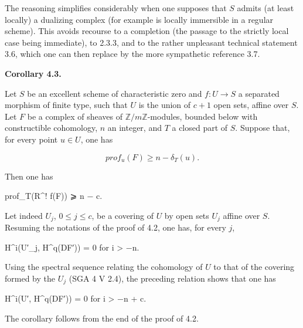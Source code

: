 \documentclass[
  11pt,
  a4paper,
]{book}
\newenvironment{Shaded}{}{}
\newcommand{\NormalTok}[1]{#1}
\begin{document}
The reasoning simplifies considerably when one supposes that \(S\)
admits (at least locally) a dualizing complex (for example is locally
immersible in a regular scheme). This avoids recourse to a completion
(the passage to the strictly local case being immediate), to 2.3.3, and
to the rather unpleasant technical statement 3.6, which one can then
replace by the more sympathetic reference 3.7.

\textbf{Corollary 4.3.}

Let \(S\) be an excellent scheme of characteristic zero and
\(f : U \to S\) a separated morphism of finite type, such that \(U\) is
the union of \(c + 1\) open sets, affine over \(S\). Let \(F\) be a
complex of sheaves of \(\mathbb{Z}/m\mathbb{Z}\)-modules, bounded below
with constructible cohomology, \(n\) an integer, and \(T\) a closed part
of \(S\). Suppose that, for every point \(u \in U\), one has

\[ prof_{u}(F) \geqslant n - \delta_{T}(u). \]

Then one has

\begin{Shaded}
\begin{Highlighting}[]
\NormalTok{prof\_T(R\^{}! f(F)) ⩾ n − c.}
\end{Highlighting}
\end{Shaded}

Let indeed \(U_{j}\), \(0 \leqslant j \leqslant c\), be a covering of
\(U\) by open sets \(U_{j}\) affine over \(S\). Resuming the notations
of the proof of 4.2, one has, for every \(j\),

\begin{Shaded}
\begin{Highlighting}[]
\NormalTok{H\^{}i(U′\_j, H\^{}q(DF′)) = 0 for i \textgreater{} −n.}
\end{Highlighting}
\end{Shaded}

Using the spectral sequence relating the cohomology of \(U\) to that of
the covering formed by the \(U_{j}\) (SGA 4 V 2.4), the preceding
relation shows that one has

\begin{Shaded}
\begin{Highlighting}[]
\NormalTok{H\^{}i(U′, H\^{}q(DF′)) = 0 for i \textgreater{} −n + c.}
\end{Highlighting}
\end{Shaded}

The corollary follows from the end of the proof of 4.2.
\end{document}
